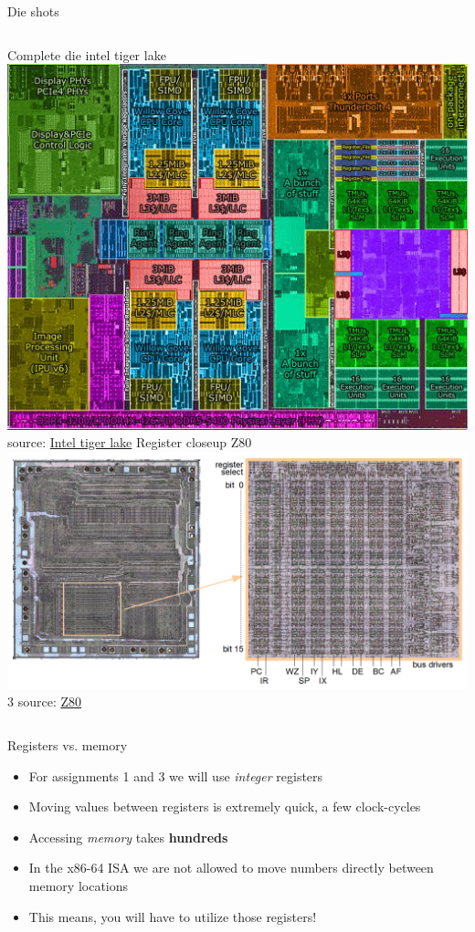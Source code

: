 \documentclass[
	11pt, %
	aspectratio=169, %
]{beamer}
\begin{document}
\begin{frame}{Die shots}
    \begin{columns}
        Complete die intel tiger lake
        \includegraphics[scale = 0.17]{./images/tiger_lake_die_shot.jpg}
        source: \href{https://www.tomshardware.com/news/intel-details-tiger-lake-at-hot-chips-2020-die-revealed}{Intel tiger lake}
        Register closeup Z80
        \includegraphics[scale = 0.17]{./images/die_register_zoom.png}3
        source: \href{https://www.righto.com/2014/10/how-z80s-registers-are-implemented-down.html}{Z80}
    \end{columns}
\end{frame}


\begin{frame}{Registers vs. memory}
    \begin{itemize}
        \item For assignments 1 and 3 we will use \textit{integer} registers
        \item Moving values between registers is extremely quick, a few clock-cycles
        \item Accessing \textit{memory} takes \textbf{hundreds}
        \item In the x86-64 ISA we are not allowed to move numbers directly between memory locations
        \item This means, you will have to utilize those registers!
    \end{itemize}

\end{frame}
\end{document}
